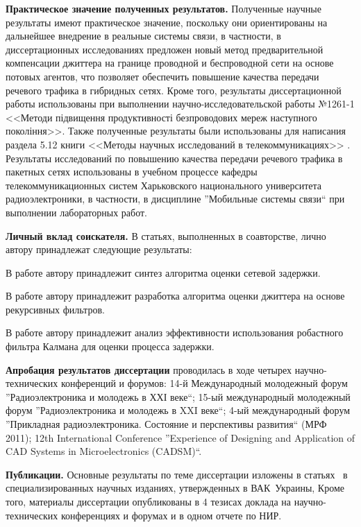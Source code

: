 \textbf{Практическое значение полученных результатов.} Полученные научные результаты имеют практическое значение, 
поскольку они ориентированы на дальнейшее внедрение в реальные системы связи, 
в частности, в диссертационных исследованиях предложен новый метод предварительной компенсации джиттера на границе проводной и беспроводной сети на основе потовых агентов,
что позволяет обеспечить повышение качества передачи речевого трафика в гибридных сетях.
Кроме того, результаты диссертационной работы использованы при выполнении научно-исследовательской работы №1261-1 <<Методи підвищення продуктивності безпроводових мереж наступного покоління>>.
Также полученные результаты были использованы для написания раздела 5.12 книги <<Методы научных исследований в телекоммуникациях>> \cite{popovski_method}.
Результаты исследований по повышению качества передачи речевого трафика в пакетных сетях использованы в учебном процессе кафедры телекоммуникационных систем Харьковского национального университета радиоэлектроники,
в частности, в дисциплине ''Мобильные системы связи`` при выполнении лабораторных работ.



\textbf{Личный вклад соискателя.} В статьях, выполненных в соавторстве, лично автору принадлежат следующие результаты: 

В работе \cite{my1} автору принадлежит синтез алгоритма оценки сетевой задержки.

В работе \cite{my2} автору принадлежит разработка алгоритма оценки джиттера на основе рекурсивных фильтров.

В работе \cite{my4} автору принадлежит анализ эффективности использования робастного фильтра Калмана для оценки процесса задержки.

\textbf{Апробация результатов диссертации} проводилась в ходе четырех научно-технических конференций и форумов:
14-й Международный молодежный форум ''Радиоэлектроника и молодежь в ХХІ веке``;
15-ый международный молодежный форум ''Радиоэлектроника и молодежь в XXI веке``;
4-ый международный форум ''Прикладная радиоэлектроника. Состояние и перспективы развития`` (МРФ 2011);
12th International Conference ''Experience of Designing and Application of CAD Systems in Microelectronics (CADSM)``.



\textbf{Публикации.} Основные результаты по теме диссертации изложены в статьях~\cite{my1,my2,my3,my4,my5} в специализированных научных изданиях, утвержденных в ВАК~Украины, Кроме того, материалы диссертации опубликованы в 4 тезисах доклада на научно-технических конференциях и форумах \cite{my6,my7,my8,my9} и в одном отчете по НИР.


\clearpage